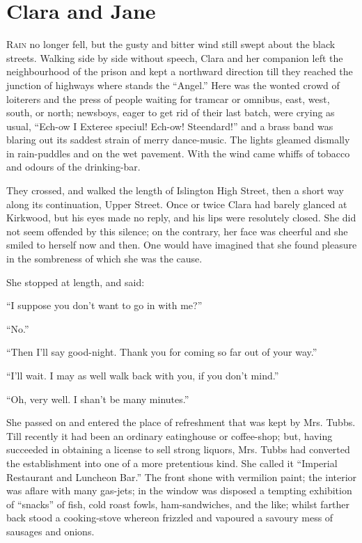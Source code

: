 \chapter{Clara and Jane}

\textsc{Rain} no longer fell, but the gusty and bitter wind still swept
about the black streets. Walking side by side without speech, Clara and
her companion left the neighbourhood of the prison and kept a northward
direction till they reached the junction of highways where stands the
``Angel.'' Here was the wonted crowd of loiterers and the press of
people waiting for tramcar or omnibus, east, west, south, or north;
newsboys, eager to get rid of their last batch, were crying as usual,
``Ech-ow I Exteree speciul! Ech-ow! Steendard!'' and a brass band was
blaring out its saddest strain of merry dance-music. The lights gleamed
dismally in rain-puddles and on the wet pavement. With the wind
{\protect\hypertarget{72}{}{}}came whiffs of tobacco and odours of the
drinking-bar.

They crossed, and walked the length of Islington High Street, then a
short way along its continuation, Upper Street. Once or twice Clara had
barely glanced at Kirkwood, but his eyes made no reply, and his lips
were resolutely closed. She did not seem offended by this silence; on
the contrary, her face was cheerful and she smiled to herself now and
then. One would have imagined that she found pleasure in the sombreness
of which she was the cause.

She stopped at length, and said:

``I suppose you don't want to go in with me?''

``No.''

``Then I'll say good-night. Thank you for coming so far out of your
way.''

``I'll wait. I may as well walk back with you, if you don't mind.''

``Oh, very well. I shan't be many minutes.''

She passed on and entered the place of
{\protect\hypertarget{73}{}{}}refreshment that was kept by Mrs. Tubbs.
Till recently it had been an ordinary eatinghouse or coffee-shop; but,
having succeeded in obtaining a license to sell strong liquors, Mrs.
Tubbs had converted the establishment into one of a more pretentious
kind. She called it ``Imperial Restaurant and Luncheon Bar.'' The front
shone with vermilion paint; the interior was aflare with many gas-jets;
in the window was disposed a tempting exhibition of ``snacks'' of fish,
cold roast fowls, ham-sandwiches, and the like; whilst farther back
stood a cooking-stove whereon frizzled and vapoured a savoury mess of
sausages and onions.

